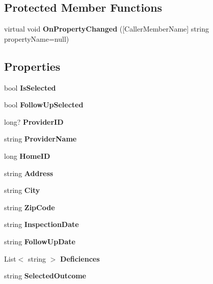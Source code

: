 \subsection*{Protected Member Functions}
\begin{DoxyCompactItemize}
\item 
virtual void \textbf{ On\+Property\+Changed} ([Caller\+Member\+Name] string property\+Name=null)
\end{DoxyCompactItemize}
\subsection*{Properties}
\begin{DoxyCompactItemize}
\item 
bool \textbf{ Is\+Selected}\hspace{0.3cm}{\ttfamily  [get, set]}
\item 
bool \textbf{ Follow\+Up\+Selected}\hspace{0.3cm}{\ttfamily  [get, set]}
\item 
long? \textbf{ Provider\+ID}\hspace{0.3cm}{\ttfamily  [get, set]}
\item 
string \textbf{ Provider\+Name}\hspace{0.3cm}{\ttfamily  [get, set]}
\item 
long \textbf{ Home\+ID}\hspace{0.3cm}{\ttfamily  [get, set]}
\item 
string \textbf{ Address}\hspace{0.3cm}{\ttfamily  [get, set]}
\item 
string \textbf{ City}\hspace{0.3cm}{\ttfamily  [get, set]}
\item 
string \textbf{ Zip\+Code}\hspace{0.3cm}{\ttfamily  [get, set]}
\item 
string \textbf{ Inspection\+Date}\hspace{0.3cm}{\ttfamily  [get, set]}
\item 
string \textbf{ Follow\+Up\+Date}\hspace{0.3cm}{\ttfamily  [get, set]}
\item 
List$<$ string $>$ \textbf{ Deficiences}\hspace{0.3cm}{\ttfamily  [get, set]}
\item 
string \textbf{ Selected\+Outcome}\hspace{0.3cm}{\ttfamily  [get, set]}
\end{DoxyCompactItemize}

